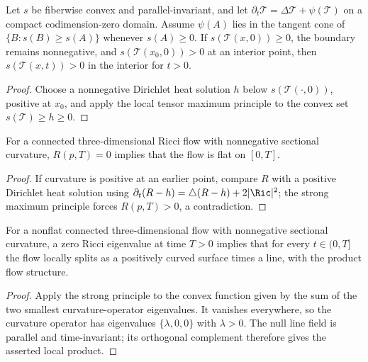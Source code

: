 \begin{proposition}
\label{prop:strong-maximum-principle-curvature}
\label{SMPcurv}
Let $s$ be fiberwise convex and parallel-invariant, and let
$\partial_t{\mathcal T}=\Delta{\mathcal T}+\psi({\mathcal T})$ on a compact
codimension-zero domain. Assume $\psi(A)$ lies in the tangent cone of
$\{B:s(B)\ge s(A)\}$ whenever $s(A)\ge0$. If $s({\mathcal T}(x,0))\ge0$,
the boundary remains nonnegative, and $s({\mathcal T}(x_0,0))>0$ at an
interior point, then $s({\mathcal T}(x,t))>0$ in the interior for $t>0$.
\end{proposition}
\begin{proof}
\sketch Choose a nonnegative Dirichlet heat solution $h$ below
$s({\mathcal T}(\cdot,0))$, positive at $x_0$, and apply the local tensor
maximum principle to the convex set $s({\mathcal T})\ge h\ge0$.
\end{proof}

\begin{theorem}
\label{thm:vanishing-scalar-curvature-forces-flat}\label{firststrongmax}
For a connected three-dimensional Ricci flow with nonnegative sectional
curvature, $R(p,T)=0$ implies that the flow is flat on $[0,T]$.
\end{theorem}
\begin{proof}
\sketch If curvature is positive at an earlier point, compare $R$ with a
positive Dirichlet heat solution using
$\partial_t(R-h)=\triangle(R-h)+2|\Ric|^2$; the strong maximum principle
forces $R(p,T)>0$, a contradiction.
\end{proof}

\begin{corollary}
\label{cor:local-product-splitting-ricci-null-eigenvalue}
\label{localprod}
For a nonflat connected three-dimensional flow with nonnegative sectional
curvature, a zero Ricci eigenvalue at time $T>0$ implies that for every
$t\in(0,T]$ the flow locally splits as a positively curved surface times a
line, with the product flow structure.
\end{corollary}
\begin{proof}
\sketch Apply the strong principle to the convex function given by the sum
of the two smallest curvature-operator eigenvalues. It vanishes everywhere,
so the curvature operator has eigenvalues $\{\lambda,0,0\}$ with $\lambda>0$.
The null line field is parallel and time-invariant; its orthogonal complement
therefore gives the asserted local product.
\end{proof}

